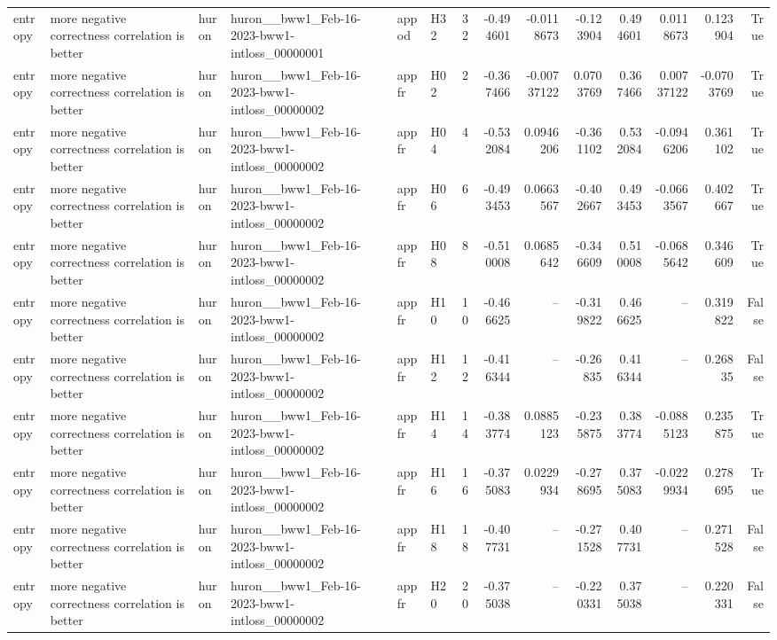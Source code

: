 \begin{longtable}{llllllrrrrrrrr}
entropy & more negative correctness correlation is better & huron & huron\_\_bww1\_Feb-16-2023-bww1-intloss\_00000001 & appod & H32 & 32 & -0.494601 & -0.0118673 & -0.123904 & 0.494601 & 0.0118673 & 0.123904 & True \\
entropy & more negative correctness correlation is better & huron & huron\_\_bww1\_Feb-16-2023-bww1-intloss\_00000002 & appfr & H02 & 2 & -0.367466 & -0.00737122 & 0.0703769 & 0.367466 & 0.00737122 & -0.0703769 & True \\
entropy & more negative correctness correlation is better & huron & huron\_\_bww1\_Feb-16-2023-bww1-intloss\_00000002 & appfr & H04 & 4 & -0.532084 & 0.0946206 & -0.361102 & 0.532084 & -0.0946206 & 0.361102 & True \\
entropy & more negative correctness correlation is better & huron & huron\_\_bww1\_Feb-16-2023-bww1-intloss\_00000002 & appfr & H06 & 6 & -0.493453 & 0.0663567 & -0.402667 & 0.493453 & -0.0663567 & 0.402667 & True \\
entropy & more negative correctness correlation is better & huron & huron\_\_bww1\_Feb-16-2023-bww1-intloss\_00000002 & appfr & H08 & 8 & -0.510008 & 0.0685642 & -0.346609 & 0.510008 & -0.0685642 & 0.346609 & True \\
entropy & more negative correctness correlation is better & huron & huron\_\_bww1\_Feb-16-2023-bww1-intloss\_00000002 & appfr & H10 & 10 & -0.466625 & -- & -0.319822 & 0.466625 & -- & 0.319822 & False \\
entropy & more negative correctness correlation is better & huron & huron\_\_bww1\_Feb-16-2023-bww1-intloss\_00000002 & appfr & H12 & 12 & -0.416344 & -- & -0.26835 & 0.416344 & -- & 0.26835 & False \\
entropy & more negative correctness correlation is better & huron & huron\_\_bww1\_Feb-16-2023-bww1-intloss\_00000002 & appfr & H14 & 14 & -0.383774 & 0.0885123 & -0.235875 & 0.383774 & -0.0885123 & 0.235875 & True \\
entropy & more negative correctness correlation is better & huron & huron\_\_bww1\_Feb-16-2023-bww1-intloss\_00000002 & appfr & H16 & 16 & -0.375083 & 0.0229934 & -0.278695 & 0.375083 & -0.0229934 & 0.278695 & True \\
entropy & more negative correctness correlation is better & huron & huron\_\_bww1\_Feb-16-2023-bww1-intloss\_00000002 & appfr & H18 & 18 & -0.407731 & -- & -0.271528 & 0.407731 & -- & 0.271528 & False \\
entropy & more negative correctness correlation is better & huron & huron\_\_bww1\_Feb-16-2023-bww1-intloss\_00000002 & appfr & H20 & 20 & -0.375038 & -- & -0.220331 & 0.375038 & -- & 0.220331 & False \\

\end{longtable}
